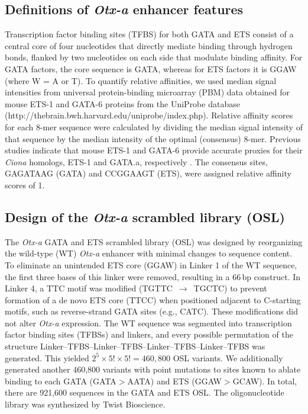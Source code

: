 \subsection{Definitions of \textit{Otx-a} enhancer features}
Transcription factor binding sites (TFBS) for both GATA and ETS consist of a central core of four nucleotides that directly mediate binding through hydrogen bonds, flanked by two nucleotides on each side that modulate binding affinity. For GATA factors, the core sequence is GATA, whereas for ETS factors it is GGAW (where W = A or T). To quantify relative affinities, we used median signal intensities from universal protein-binding microarray (PBM) data obtained for mouse ETS-1\cite{Wei2010-di} and GATA-6\cite{Badis2009-hv} proteins from the UniProbe database (http://thebrain.bwh.harvard.edu/uniprobe/index.php)\cite{Hume2015-xj}. Relative affinity scores for each 8-mer sequence were calculated by dividing the median signal intensity of that sequence by the median intensity of the optimal (consensus) 8-mer. Previous studies indicate that mouse ETS-1 and GATA-6 provide accurate proxies for their \textit{Ciona} homologs, ETS-1 and GATA.a, respectively \cite{Farley2015-xx,Nitta2015-rt,Wei2010-di}. The consensus sites, GAGATAAG (GATA) and CCGGAAGT (ETS), were assigned relative affinity scores of 1.

\subsection{Design of the \textit{Otx-a} scrambled library (OSL)}
The \textit{Otx-a} GATA and ETS scrambled library (OSL) was designed by reorganizing the wild-type (WT) \textit{Otx-a} enhancer with minimal changes to sequence content. To eliminate an unintended ETS core (GGAW) in Linker 1 of the WT sequence, the first three bases of this linker were removed, resulting in a 66\,bp construct. In Linker 4, a TTC motif was modified (TGTTC~$\rightarrow$~TGCTC) to prevent formation of a de novo ETS core (TTCC) when positioned adjacent to C-starting motifs, such as reverse-strand GATA sites (e.g., CATC). These modifications did not alter \textit{Otx-a} expression. The WT sequence was segmented into transcription factor binding sites (TFBSs) and linkers, and every possible permutation of the structure Linker–TFBS–Linker–TFBS–Linker–TFBS–Linker–TFBS was generated. This yielded $2^5 \times 5! \times 5! = 460{,}800$ OSL variants. We additionally generated another 460,800 variants with point mutations to sites known to ablate binding to each GATA (GATA$>$AATA)\cite{Bertrand2003-su} and ETS (GGAW$>$GCAW)\cite{Woznica2012-jd,Schachterle2012-kq}. In total, there are 921,600 sequences in the GATA and ETS OSL. The oligonucleotide library was synthesized by Twist Bioscience.

